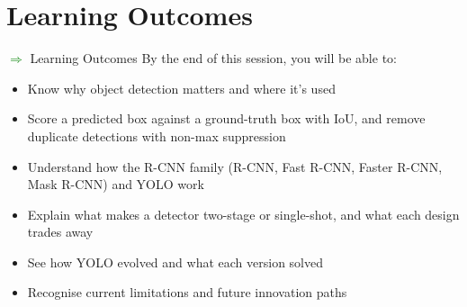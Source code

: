 \section{Learning Outcomes}
\begin{frame}[allowframebreaks]{\textcolor{green}{$\Rightarrow$} Learning Outcomes}
    By the end of this session, you will be able to:
        \begin{itemize}
            \item Know why object detection matters and where it's used
            \item Score a predicted box against a ground-truth box with IoU, and remove duplicate detections with non-max suppression
            \item Understand how the R-CNN family (R-CNN, Fast R-CNN, Faster R-CNN, Mask R-CNN) and YOLO work
            \item Explain what makes a detector two-stage or single-shot, and what each design trades away
            \item See how YOLO evolved and what each version solved
            \item Recognise current limitations and future innovation paths
        \end{itemize}
\end{frame}
